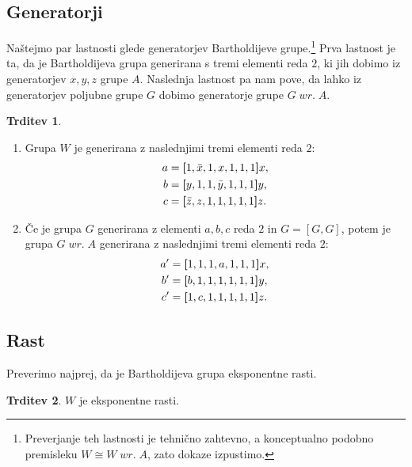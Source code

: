 \documentclass[11pt]{book}
\renewcommand{\wreath}{\; wr. \;}
\theoremstyle{definition}
\theoremstyle{zgled}
\theoremstyle{odprtproblem}
\theoremstyle{domacanaloga}
\theoremstyle{izrek}
\newtheorem*{trditev}{Trditev}
\begin{document}
\subsection{Generatorji}

Naštejmo par lastnosti glede generatorjev Bartholdijeve grupe.\footnote{Preverjanje teh lastnosti je tehnično zahtevno, a konceptualno podobno premisleku $W \cong W \wreath A$, zato dokaze izpustimo.} Prva lastnost je ta, da je Bartholdijeva grupa generirana s tremi elementi reda $2$, ki jih dobimo iz generatorjev $x,y,z$ grupe $A$. Naslednja lastnost pa nam pove, da lahko iz generatorjev poljubne grupe $G$ dobimo generatorje grupe $G \wreath A$.

\begin{trditev}
\vspace{-0.5\baselineskip}
\begin{enumerate}[noitemsep]
\item Grupa $W$ je generirana z naslednjimi tremi elementi reda $2$:
\[
\begin{aligned}
a &= {\textbf [} 1, \bar x, 1, x ,1 ,1, 1 {\textbf ]} x, \\
b &= {\textbf [} y, 1, 1, \bar y, 1, 1, 1 {\textbf ]} y, \\
c &= {\textbf [} \bar z, z, 1, 1, 1, 1, 1 {\textbf ]} z.
\end{aligned}
\]

    \item Če je grupa $G$ generirana z elementi $a,b,c$ reda $2$ in $G = [G,G]$, potem je grupa $G \wreath A$ generirana z naslednjimi tremi elementi reda $2$:
\[
\begin{aligned}
a^\prime &= {\textbf [} 1, 1, 1, a ,1, 1, 1 {\textbf ]} x, \\
b^\prime &= {\textbf [} b, 1, 1, 1, 1, 1, 1 {\textbf ]} y, \\
c^\prime &= {\textbf [} 1, c, 1, 1, 1, 1, 1 {\textbf ]} z.
\end{aligned}
\]
\vspace{-2\baselineskip}
\end{enumerate}
\end{trditev}

\subsection{Rast}

Preverimo najprej, da je Bartholdijeva grupa eksponentne rasti.

\begin{trditev}
$W$ je eksponentne rasti.
\end{trditev}
\end{document}
